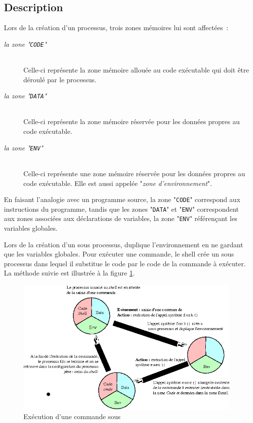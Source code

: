 \subsection{Description}

Lors de la cr{\'e}ation d'un processus, trois zones
m{\'e}moires lui sont affect{\'e}es~:
\begin{description}
	\item[\textsl{la zone "\texttt{CODE}"}]\mbox{}\\
		Celle-ci repr{\'e}sente la zone m{\'e}moire allou{\'e}e au code ex{\'e}cutable qui
		doit {\^e}tre d{\'e}roul{\'e} par le processus.
	\item[\textsl{la zone "\texttt{DATA}"}]\mbox{}\\
		Celle-ci repr{\'e}sente la zone m{\'e}moire r{\'e}serv{\'e}e pour les donn{\'e}es propres
		au code ex{\'e}cutable.
	\item[\textsl{la zone "\texttt{ENV}"}]\mbox{}\\
		Celle-ci repr{\'e}sente une zone m{\'e}moire r{\'e}serv{\'e}e pour les donn{\'e}es propres
		au code ex{\'e}cutable. Elle est aussi appel{\'e}e
		"\textsl{zone d'environnement}".
\end{description}
En faisant l'analogie avec un programme source, la zone "\texttt{CODE}"
correspond aux instructions du programme, tandis que les zones
"\texttt{DATA}" et "\texttt{ENV}" correspondent aux zones associ{\'e}es
aux d{\'e}clarations de variables, la zone "\texttt{ENV}" r{\'e}f{\'e}ren\c{c}ant
les variables globales.

Lors de la cr{\'e}ation d'un sous processus, {\Unix} duplique l'environnement en
ne gardant que les variables globales.
Pour ex{\'e}cuter une commande, le shell cr{\'e}e un sous processus dans lequel
il substitue le code par le code de la commande {\`a} ex{\'e}cuter. La m{\'e}thode suivie est
illustr{\'e}e {\`a} la figure \ref{fig-basnot-exec-cmd}.

\begin{figure}[hbtp]
\centering
\includegraphics{./_Images/basic-notions/exec-cmd.jpg}
\caption{\label{fig-basnot-exec-cmd}Ex{\'e}cution d'une commande sous {\Unix}}
\end{figure}

